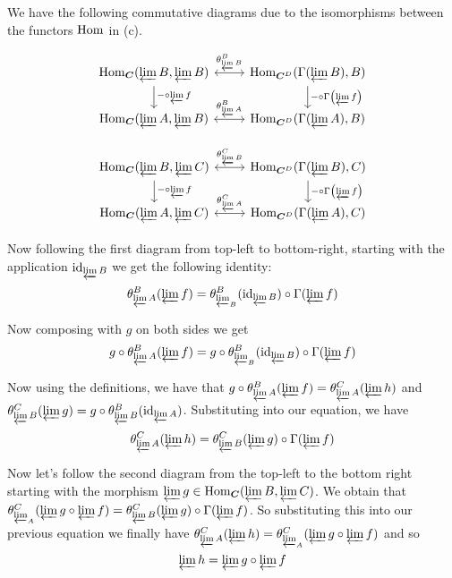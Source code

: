 \begin{sol}
\begin{enumerate}[label=\alph*)]
		We have the following commutative diagrams due to the isomorphisms between the functors $\mathrm{Hom}$ in (c).

		\[
			\begin{tikzcd}
				\Hom_{\Cat}(\varprojlim B, \varprojlim B) \arrow[r, "\theta^B_{\varprojlim B}", leftrightarrow] \arrow[d, "- \circ \varprojlim f"]
				  & \Hom_{\Cat^D} (\Gamma(\varprojlim B), B) \arrow[d, "- \circ \Gamma \left( \varprojlim f \right )"]\\
				\Hom_{\Cat}(\varprojlim A, \varprojlim B) \arrow[r, "\theta^B_{\varprojlim A}", leftrightarrow] 
				  & \Hom_{\Cat^D} (\Gamma(\varprojlim A), B) 
			\end{tikzcd}
		\]


		\[
			\begin{tikzcd}
				\Hom_{\Cat}(\varprojlim B, \varprojlim C) \arrow[r, "\theta^C_{\varprojlim B}", leftrightarrow] \arrow[d, "- \circ \varprojlim f"]
				  & \Hom_{\Cat^D} (\Gamma(\varprojlim B), C) \arrow[d, "- \circ \Gamma \left( \varprojlim f \right )"]\\
				\Hom_{\Cat}(\varprojlim A, \varprojlim C) \arrow[r, "\theta^C_{\varprojlim A}", leftrightarrow] 
				  & \Hom_{\Cat^D} (\Gamma(\varprojlim A), C) 
			\end{tikzcd}
		\]

		Now following the first diagram from top-left to bottom-right, starting with the application $\text{id}_{\varprojlim B}$ we get the following identity:
		\[
			\theta^B_{\varprojlim A}(\varprojlim f) = \theta^B_{\varprojlim_B}(\text{id}_{\varprojlim B}) \circ \Gamma(\varprojlim f)
		\] 

		Now composing with $g$ on both sides we get
		\[
			g \circ \theta^B_{\varprojlim A}(\varprojlim f) = g \circ \theta^B_{\varprojlim_B}(\text{id}_{\varprojlim B}) \circ \Gamma(\varprojlim f)
		\] 

		Now using the definitions, we have that $g \circ \theta^B_{\varprojlim A}(\varprojlim f) = \theta^C_{\varprojlim A}(\varprojlim h)$ and $\theta^C_{\varprojlim B}(\varprojlim g) =  g \circ \theta_{\varprojlim B}^B(\text{id}_{\varprojlim A})$. Substituting into our equation, we have 
		\[
			\theta^C_{\varprojlim A}(\varprojlim h) = \theta^C_{\varprojlim B}(\varprojlim g) \circ \Gamma(\varprojlim f)
		\]

		Now let's follow the second diagram from the top-left to the bottom right starting with the morphism $\varprojlim g \in \mathrm{Hom}_{\boldsymbol{C}}(\varprojlim B, \varprojlim C)$. We obtain that $\theta^C_{\varprojlim_A}(\varprojlim g \circ \varprojlim f) = \theta^C_{\varprojlim B}(\varprojlim g) \circ \Gamma(\varprojlim f)$. So substituting this into our previous equation we finally have $\theta^C_{\varprojlim A}(\varprojlim h) = \theta^C_{\varprojlim_A}(\varprojlim g \circ \varprojlim f)$ and so
		\[
			\varprojlim h = \varprojlim g \circ \varprojlim f
		\]


\end{enumerate}
\end{sol}
